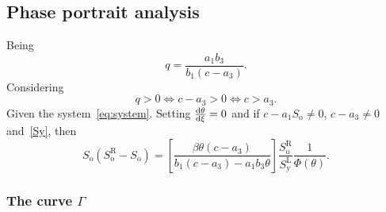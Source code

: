 \subsection{Phase portrait analysis}

Being
\begin{equation*}
	q=
	\frac{a_{1}b_{3}}{b_{1}\left(c-a_{3}\right)}.
\end{equation*}
Considering
\begin{equation*}
	q>0\iff
	c-a_{3}>0\iff
	c>a_{3}.
\end{equation*}
Given the system~\eqref{eq:system}.
Setting $\diff{\theta}{\xi}=0$ and if $c-a_{1}S_{\text{o}}\neq 0$,
$c-a_{3}\neq 0$ and~\eqref{Sy}, then
\begin{equation*}
	S_{\text{o}}\left(S^{\text{R}}_{\text{o}}-S_{\text{o}}\right)=
	\left[
		\frac{\beta\theta\left(c-a_{3}\right)}{b_{1}\left(c-a_{3}\right)-a_{1}b_{3}\theta}
		\right]
	\frac{S^{\text{R}}_{\text{o}}}{S^{\text{L}}_{\text{y}}}
	\frac{1}{\Phi\left(\theta\right)}.
\end{equation*}

\subsubsection{The curve $\Gamma$}

